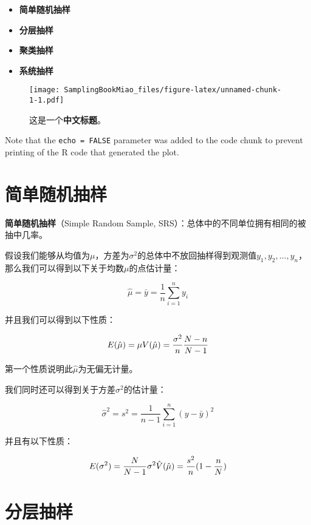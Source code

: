 \documentclass[]{ctexbook}
\providecommand{\tightlist}{%
  \setlength{\itemsep}{0pt}\setlength{\parskip}{0pt}}
\begin{document}
\begin{itemize}
\tightlist
\item
  \textbf{简单随机抽样}
\item
  \textbf{分层抽样}
\item
  \textbf{聚类抽样}
\item
  \textbf{系统抽样}
\end{itemize}



\begin{figure}
\centering
\texttt{[image: SamplingBookMiao\_files/figure-latex/unnamed-chunk-1-1.pdf]}
\caption{\label{fig:unnamed-chunk-1}这是一个\textbf{中文标题}。}
\end{figure}

Note that the \texttt{echo\ =\ FALSE} parameter was added to the code chunk to prevent printing of the R code that generated the plot.

\hypertarget{section-1}{%
\chapter{简单随机抽样}\label{section-1}}

\textbf{简单随机抽样}（Simple Random Sample, SRS）：总体中的不同单位拥有相同的被抽中几率。

假设我们能够从均值为\(\mu\)，方差为\(\sigma^2\)的总体中不放回抽样得到观测值\(y_1, y_2, \dots, y_n\)，那么我们可以得到以下关于均数\(\mu\)的点估计量：

\[\hat{\mu} = \bar{y} = \frac{1}{n}\sum_{i=1}^ny_i\]

并且我们可以得到以下性质：

\[
E(\hat{\mu}) = \mu\\
V(\hat{\mu}) = \frac{\sigma^2}{n}\frac{N-n}{N-1}
\]

第一个性质说明此\(\hat{\mu}\)为无偏无计量。

我们同时还可以得到关于方差\(\sigma^2\)的估计量：

\[\hat{\sigma}^2 = s^2 = \frac{1}{n-1}\sum_{i=1}^n(y-\bar{y})^2\]

并且有以下性质：

\[
E(\sigma^2) = \frac{N}{N-1}\sigma^2\\
\hat{V}(\hat{\mu}) = \frac{s^2}{n}(1-\frac{n}{N})
\]

\hypertarget{section-2}{%
\chapter{分层抽样}\label{section-2}}
\end{document}

